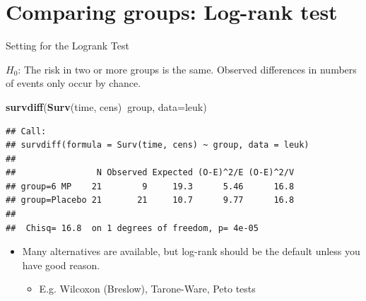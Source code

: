 \documentclass[
  ignorenonframetext,
]{beamer}
\newenvironment{Shaded}{\begin{snugshade}}{\end{snugshade}}
\newcommand{\DataTypeTok}[1]{\textcolor[rgb]{0.13,0.29,0.53}{#1}}
\newcommand{\KeywordTok}[1]{\textcolor[rgb]{0.13,0.29,0.53}{\textbf{#1}}}
\newcommand{\NormalTok}[1]{#1}
\newcommand{\OperatorTok}[1]{\textcolor[rgb]{0.81,0.36,0.00}{\textbf{#1}}}
\providecommand{\tightlist}{%
  \setlength{\itemsep}{0pt}\setlength{\parskip}{0pt}}
\begin{document}
\hypertarget{comparing-groups-log-rank-test}{%
\section{Comparing groups: Log-rank
test}\label{comparing-groups-log-rank-test}}

\begin{frame}[fragile]{Setting for the Logrank Test}
\protect\hypertarget{setting-for-the-logrank-test}{}

\(H_0\): The risk in two or more groups is the same. Observed
differences in numbers of events only occur by chance.

\footnotesize

\begin{Shaded}
\begin{Highlighting}[]
\KeywordTok{survdiff}\NormalTok{(}\KeywordTok{Surv}\NormalTok{(time, cens)}\OperatorTok{~}\NormalTok{group, }\DataTypeTok{data=}\NormalTok{leuk)}
\end{Highlighting}
\end{Shaded}

\begin{verbatim}
## Call:
## survdiff(formula = Surv(time, cens) ~ group, data = leuk)
## 
##                N Observed Expected (O-E)^2/E (O-E)^2/V
## group=6 MP    21        9     19.3      5.46      16.8
## group=Placebo 21       21     10.7      9.77      16.8
## 
##  Chisq= 16.8  on 1 degrees of freedom, p= 4e-05
\end{verbatim}

\begin{itemize}
\tightlist
\item
  Many alternatives are available, but log-rank should be the default
  unless you have good reason.

  \begin{itemize}
  \tightlist
  \item
    E.g. Wilcoxon (Breslow), Tarone-Ware, Peto tests
  \end{itemize}
\end{itemize}

\end{frame}
\end{document}
